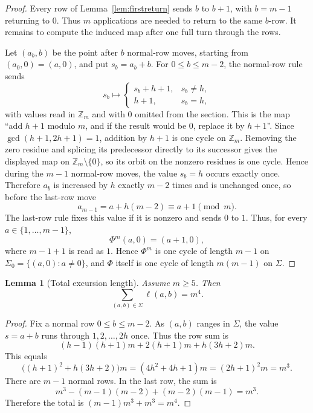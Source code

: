 \documentclass[11pt]{article}
\newtheorem{lemma}{Lemma}
\theoremstyle{definition}
\begin{document}
\begin{proof}
Every row of Lemma~\ref{lem:firstreturn} sends \(b\) to \(b+1\), with \(b=m-1\) returning to \(0\).
Thus \(m\) applications are needed to return to the same \(b\)-row.  It remains to compute the induced
map after one full turn through the rows.

Let \((a_b,b)\) be the point after \(b\) normal-row moves, starting from \((a_0,0)=(a,0)\), and put
\(s_b=a_b+b\).  For \(0\le b\le m-2\), the normal-row rule sends
\[
s_b\longmapsto
\begin{cases}
 s_b+h+1,&s_b\ne h,\\
 h+1,&s_b=h,
\end{cases}
\]
with values read in \(\mathbb Z_m\) and with \(0\) omitted from the section.  This is the map
``add \(h+1\) modulo \(m\), and if the result would be \(0\), replace it by \(h+1\)''.  Since
\(\gcd(h+1,2h+1)=1\), addition by \(h+1\) is one cycle on \(\mathbb Z_m\).  Removing the
zero residue and splicing its predecessor directly to its successor gives the displayed map on
\(\mathbb Z_m\setminus\{0\}\), so its orbit on the nonzero residues is one cycle.  Hence during the
\(m-1\) normal-row moves, the value \(s_b=h\) occurs exactly once.  Therefore \(a_b\) is increased by
\(h\) exactly \(m-2\) times and is unchanged once, so before the last-row move
\[
a_{m-1}=a+h(m-2)\equiv a+1\pmod m.
\]
The last-row rule fixes this value if it is nonzero and sends \(0\) to \(1\).  Thus, for every
\(a\in\{1,\ldots,m-1\}\),
\[
\Phi^m(a,0)=(a+1,0),
\]
where \(m-1+1\) is read as \(1\).  Hence \(\Phi^m\) is one cycle of length \(m-1\) on
\(\Sigma_0=\{(a,0):a\ne0\}\), and \(\Phi\) itself is one cycle of length \(m(m-1)\) on \(\Sigma\).
\end{proof}

\begin{lemma}[Total excursion length]\label{lem:total}
Assume \(m\ge5\).  Then
\[
\sum_{(a,b)\in\Sigma}\ell(a,b)=m^4.
\]
\end{lemma}

\begin{proof}
Fix a normal row \(0\le b\le m-2\).  As \((a,b)\) ranges in \(\Sigma\), the value \(s=a+b\) runs
through \(1,2,\ldots,2h\) once.  Thus the row sum is
\[
(h-1)(h+1)m+2(h+1)m+h(3h+2)m.
\]
This equals
\[
\bigl((h+1)^2+h(3h+2)\bigr)m=(4h^2+4h+1)m=(2h+1)^2m=m^3.
\]
There are \(m-1\) normal rows.  In the last row, the sum is
\[
m^3-(m-1)(m-2)+(m-2)(m-1)=m^3.
\]
Therefore the total is \((m-1)m^3+m^3=m^4\).
\end{proof}
\end{document}
